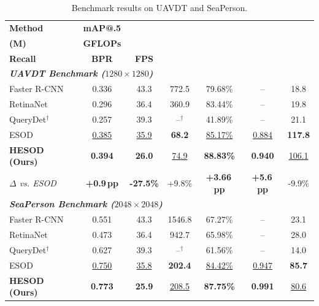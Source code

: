 \begin{table}[t]
\centering
\caption{Benchmark results on UAVDT and SeaPerson.}
\label{tab:main_results}
\vspace{1mm}
\scriptsize
\setlength{\tabcolsep}{0pt}
\renewcommand{\arraystretch}{1.12}
\begin{tabular*}{\columnwidth}{@{\extracolsep{\fill}}lcccccc@{}}
\toprule
\textbf{Method} & \textbf{mAP@.5} & \shortstack{\textbf{Params}\\\textbf{(M)}} & \textbf{GFLOPs} & \shortstack{\textbf{Total}\\\textbf{Recall}} & \textbf{BPR} & \textbf{FPS} \\
\midrule
\multicolumn{7}{l}{\textit{\textbf{UAVDT Benchmark ($1280\times 1280$)}}} \\
Faster R-CNN~\cite{FasterRCNN}     & 0.336 & 43.3 & 772.5 & 79.68\% & -- & 18.8 \\
RetinaNet~\cite{RetinaNet}           & 0.296 & 36.4 & 360.9 & 83.44\% & -- & 19.8 \\
QueryDet$^\dagger$~\cite{QueryDet}   & 0.257 & 39.3 & --$^\dagger$ & 41.89\% & -- & 21.1 \\
ESOD~\cite{ESOD}                     & \underline{0.385} & \underline{35.9} & \textbf{68.2} & \underline{85.17\%} & \underline{0.884} & \textbf{117.8} \\
\textbf{HESOD (Ours)}                & \textbf{0.394} & \textbf{26.0} & \underline{74.9} & \textbf{88.83\%} & \textbf{0.940} & \underline{106.1} \\
\textit{$\Delta$ vs. ESOD} & \textbf{+0.9\,pp} & \textbf{-27.5\%} & +9.8\% & \textbf{+3.66\,pp} & \textbf{+5.6\,pp} & -9.9\% \\
\midrule
\multicolumn{7}{l}{\textit{\textbf{SeaPerson Benchmark ($2048\times 2048$)}}} \\
Faster R-CNN~\cite{FasterRCNN}     & 0.551 & 43.3 & 1546.8 & 67.27\% & -- & 23.1 \\
RetinaNet~\cite{RetinaNet}         & 0.473 & 36.4 & 942.7  & 65.98\% & -- & 28.0 \\
QueryDet$^\dagger$~\cite{QueryDet} & 0.627 & 39.3 & --$^\dagger$ & 61.56\% & -- & 14.0 \\
ESOD~\cite{ESOD}                   & \underline{0.750} & \underline{35.8} & \textbf{202.4} & \underline{84.42\%} & \underline{0.947} & \textbf{85.7} \\
\textbf{HESOD (Ours)}              & \textbf{0.773} & \textbf{25.9} & \underline{208.5} & \textbf{87.75\%} & \textbf{0.991} & \underline{80.6} \\

\end{tabular*}
\end{table}
